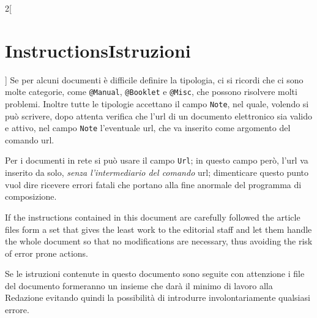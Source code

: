 \documentclass[12pt]{article}
\providecommand\cs[1]{\textnormal{\ttfamily\char92#1}}
\providecommand\italian{\selectlanguage{italian}}
\providecommand\english{\selectlanguage{english}}
\begin{document}
\begin{paracol}{2}[\section{Instructions\hspace{5.6em}Istruzioni}]
Se per alcuni documenti è difficile definire la tipologia, ci si ricordi che ci sono molte categorie, come \texttt{@Manual}, \texttt{@Booklet} e \texttt{@Misc}, che possono risolvere molti problemi. Inoltre tutte le tipologie accettano il campo \texttt{Note}, nel quale, volendo si può scrivere, dopo attenta verifica che l'url di un documento elettronico sia valido e attivo, nel campo \texttt{Note} l'eventuale url, che va inserito come argomento del comando \cs{url}.

Per i documenti in rete si può usare il campo \texttt{Url}; in questo campo però, l'url va inserito da solo, \emph{senza l'intermediario del comando} \cs{url}; dimenticare questo punto vuol dire ricevere errori fatali che portano alla fine anormale del programma di composizione.


\english

If the instructions contained in this document are carefully followed the article files form a set that gives the least work to the editorial staff and let them handle the whole document so that no modifications are necessary, thus avoiding the risk of error prone actions.

\italian

Se le istruzioni contenute in questo documento sono seguite con attenzione i file del documento formeranno un insieme che darà il minimo di lavoro alla Redazione evitando quindi la possibilità di introdurre involontariamente qualsiasi errore.


\end{paracol}
\end{document}

